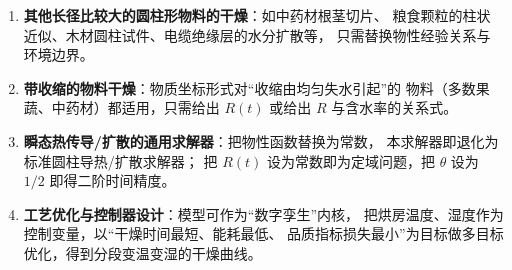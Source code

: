 \begin{enumerate}[leftmargin=2.2em,itemsep=0.25em]
  \item \textbf{其他长径比较大的圆柱形物料的干燥}：如中药材根茎切片、
        粮食颗粒的柱状近似、木材圆柱试件、电缆绝缘层的水分扩散等，
        只需替换物性经验关系与环境边界。
  \item \textbf{带收缩的物料干燥}：物质坐标形式对“收缩由均匀失水引起”的
        物料（多数果蔬、中药材）都适用，只需给出 $R(t)$ 或给出
        $R$ 与含水率的关系式。
  \item \textbf{瞬态热传导/扩散的通用求解器}：把物性函数替换为常数，
        本求解器即退化为标准圆柱导热/扩散求解器；
        把 $R(t)$ 设为常数即为定域问题，把 $\theta$ 设为 $1/2$ 即得二阶时间精度。
  \item \textbf{工艺优化与控制器设计}：模型可作为“数字孪生”内核，
        把烘房温度、湿度作为控制变量，以“干燥时间最短、能耗最低、
        品质指标损失最小”为目标做多目标优化，得到分段变温变湿的干燥曲线。
\end{enumerate}

